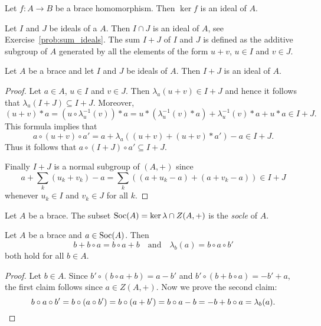 \begin{example}
	Let $f\colon A\to B$ be a brace homomorphism. Then $\ker f$ 
	is an ideal of $A$.
\end{example}

Let $I$ and $J$ be ideals
of a $A$. Then $I\cap J$ is an ideal of $A$, see Exercise~\ref{prob:sum_ideals}.  
The sum $I+J$ of $I$ and $J$ is defined as the
additive subgroup of $A$ generated by all the 
elements of the form
$u+v$, $u\in I$ and $v\in J$. 

\begin{proposition}
Let $A$ be a brace and let
$I$ and $J$ be ideals of $A$. Then $I+J$ is an ideal of $A$.
\end{proposition}

\begin{proof}
    Let $a\in A$, $u\in I$ and $v\in J$. Then $\lambda_a(u+v)\in I+J$ and
    hence it follows that $\lambda_a(I+J)\subseteq I+J$. Moreover, 
    \[
        (u+v)*a=(u\circ\lambda^{-1}_u(v))*a
        =u*(\lambda^{-1}_u(v)*a)+\lambda^{-1}_u(v)*a+u*a\in I+J.
    \]
    This formula implies that  
    \[
        a\circ (u+v)\circ a'=a+\lambda_a((u+v)+(u+v)*a')-a\in I+J.
    \]
    Thus it follows that $a\circ (I+J)\circ a'\subseteq I+J$.
    
    Finally $I+J$ is a normal subgroup of $(A,+)$ since
    \[
        a+\sum_{k} (u_k+v_k)-a=\sum_k ((a+u_k-a)+(a+v_k-a))\in I+J
    \]
    whenever $u_k\in I$ and $v_k\in J$ for all $k$. 
\end{proof}


\begin{definition}
	Let $A$ be a brace. The subset 
	$\operatorname{Soc}(A)=\ker\lambda\cap Z(A,+)$
	is the \emph{socle} of $A$.
\end{definition}

\begin{lemma}
    \label{lem:socle}
    Let $A$ be a brace and $a\in\operatorname{Soc}(A)$. Then 
    \[
    b+b\circ a=b\circ a+b\quad\text{and}\quad
    \lambda_b(a)=b\circ a\circ b'
    \]
    both hold 
    for all $b\in A$.
\end{lemma}

\begin{proof}
    Let $b\in A$. Since
    $b'\circ (b\circ a+b)=a-b'$ and
    $b'\circ (b+b\circ a)=-b'+a$, the first claim follows since
    $a\in Z(A,+)$.
    Now we prove the second claim:
    \[
    b\circ a\circ b'=b\circ (a\circ b')=b\circ (a+b')=b\circ a-b=-b+b\circ
    a=\lambda_b(a).\qedhere
    \]
\end{proof}

